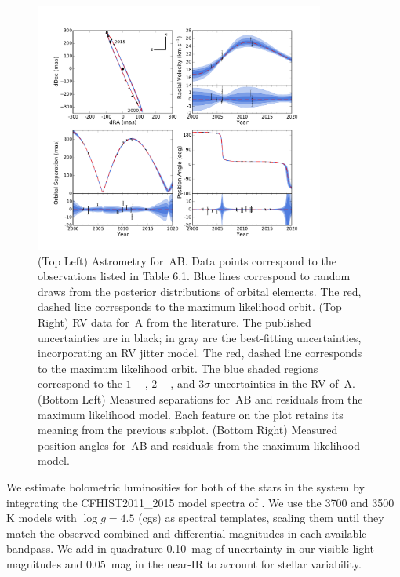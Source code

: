 \begin{figure}[htbp!]
\centerline{\includegraphics[width=0.85\textwidth]{chapter6/f1.pdf}}
\caption[Astrometry and RV data for \thisstarsix\,AB]{(Top Left) Astrometry for \thisstarsix\,AB. Data points correspond to the observations
listed in Table 6.1. Blue lines correspond to random draws from the posterior
distributions of orbital elements. The red, dashed line corresponds to the maximum likelihood
orbit. (Top Right) RV data for \thisstarsix\,A from the literature. 
The published uncertainties are in black;
in gray are the best-fitting uncertainties, incorporating an RV jitter model. The red, dashed
line corresponds to the maximum likelihood orbit. The blue shaded regions correspond
to the $1-$, $2-$, and $3\sigma$ uncertainties in the RV of \thisstarsix\,A.
(Bottom Left) Measured separations for \thisstarsix\,AB and residuals from the maximum likelihood
model. 
Each feature on the plot retains its meaning from the previous subplot.
(Bottom Right) Measured position angles for \thisstarsix\,AB and residuals from the maximum 
likelihood model.
  }
\label{fig:fits}
\end{figure}

We estimate bolometric luminosities for both of the stars in the system by integrating the CFHIST2011\_2015 model 
spectra of \citet{Baraffe15}.
We use the 3700 and 3500 K models with $\log g = 4.5$ (cgs) as spectral templates, scaling them
until they match the observed combined and differential magnitudes in each available bandpass.
We add in quadrature 0.10~mag of uncertainty in our visible-light magnitudes and 0.05~mag in 
the near-IR to account for stellar variability.


